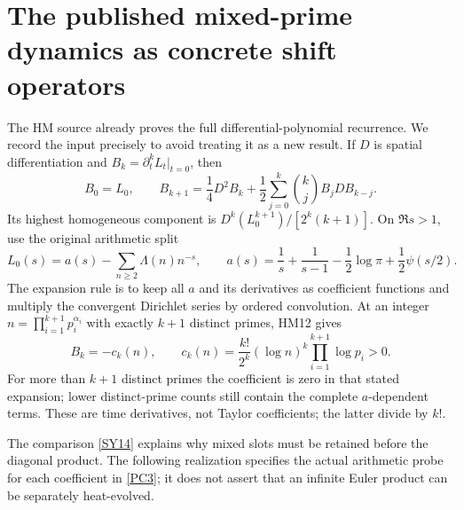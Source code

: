 \documentclass[11pt,a4paper]{article}
\theoremstyle{definition}\newtheorem{definition}[theorem]{Definition}
\begin{document}
\section{The published mixed-prime dynamics as concrete shift operators}
The HM source \cite{HM} already proves the full differential-polynomial recurrence. We record the input precisely to avoid treating it as a new result. If $D$ is spatial differentiation and $B_k=\partial_t^kL_t|_{t=0}$, then
\begin{equation}
 B_0=L_0,\qquad
 B_{k+1}=\frac14D^2B_k+
 \frac12\sum_{j=0}^k\binom{k}{j}B_jDB_{k-j}.
                                                               \tag{PC1}\label{PC1}
\end{equation}
Its highest homogeneous component is
$D^k(L_0^{k+1})/[2^k(k+1)]$.
On $\Re s>1$, use the original arithmetic split
\begin{equation}
 L_0(s)=a(s)-\sum_{n\ge2}\Lambda(n)n^{-s},\qquad
 a(s)=\frac1s+\frac1{s-1}-\frac12\log\pi+\frac12\psi(s/2).
                                                               \tag{PC2}\label{PC2}
\end{equation}
The expansion rule is to keep all $a$ and its derivatives as coefficient functions and multiply the convergent Dirichlet series by ordered convolution. At an integer
$n=\prod_{i=1}^{k+1}p_i^{\alpha_i}$ with exactly $k+1$ distinct primes, HM12 gives
\begin{equation}
 [n^{-s}]B_k=-c_k(n),\qquad
 c_k(n)=\frac{k!}{2^k}(\log n)^k\prod_{i=1}^{k+1}\log p_i>0.
                                                               \tag{PC3}\label{PC3}
\end{equation}
For more than $k+1$ distinct primes the coefficient is zero in that stated expansion; lower distinct-prime counts still contain the complete $a$-dependent terms. These are time derivatives, not Taylor coefficients; the latter divide by $k!$.

The comparison \eqref{SY14} explains why mixed slots must be retained before the diagonal product. The following realization specifies the actual arithmetic probe for each coefficient in \eqref{PC3}; it does not assert that an infinite Euler product can be separately heat-evolved.
\end{document}
